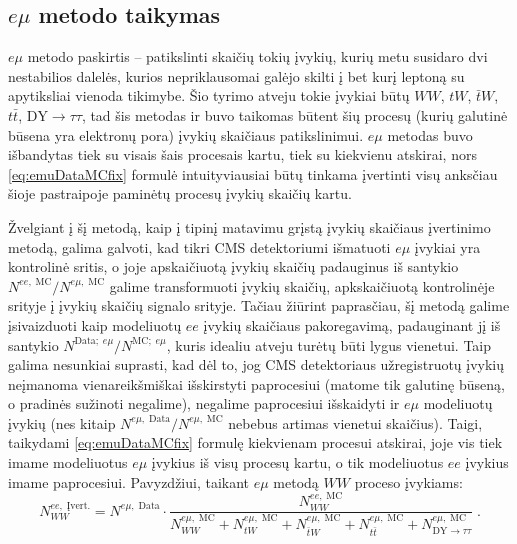 \documentclass[a4paper, 12pt]{article}
\newcommand{\WW}{W\! W}
\newcommand{\DYtau}{\mathrm{DY} \! \rightarrow \! \tau\tau}
\newlength\q
\begin{document}
\subsection{$e\mu$ metodo taikymas} \label{sec:emu}
$e\mu$ metodo paskirtis -- patikslinti skaičių tokių įvykių, kurių metu susidaro dvi nestabilios dalelės, kurios nepriklausomai galėjo skilti į bet kurį leptoną su apytiksliai vienoda tikimybe. Šio tyrimo atveju tokie įvykiai būtų $\WW$, $tW$, $\bar{t}W$, $t\bar{t}$, $\DYtau$, tad šis metodas ir buvo taikomas būtent šių procesų (kurių galutinė būsena yra elektronų pora) įvykių skaičiaus patikslinimui. $e\mu$ metodas buvo išbandytas tiek su visais šais procesais kartu, tiek su kiekvienu atskirai, nors \eqref{eq:emuDataMCfix} formulė intuityviausiai būtų tinkama įvertinti visų anksčiau šioje pastraipoje paminėtų procesų įvykių skaičių kartu.

Žvelgiant į šį metodą, kaip į tipinį matavimu grįstą įvykių skaičiaus įvertinimo metodą, galima galvoti, kad tikri CMS detektoriumi išmatuoti $e\mu$ įvykiai yra kontrolinė sritis, o joje apskaičiuotą įvykių skaičių padauginus iš santykio $N^{ee , \; \mathrm{MC}}/N^{e\mu , \; \mathrm{MC}}$ galime transformuoti įvykių skaičių, apkskaičiuotą kontrolinėje srityje į įvykių skaičių signalo srityje. Tačiau žiūrint paprasčiau, šį metodą galime įsivaizduoti kaip modeliuotų $ee$ įvykių skaičiaus pakoregavimą, padauginant jį iš santykio $N^{\mathrm{Data}; \; e\mu}/N^{\mathrm{MC}; \; e\mu}$, kuris idealiu atveju turėtų būti lygus vienetui. Taip galima nesunkiai suprasti, kad dėl to, jog CMS detektoriaus užregistruotų įvykių neįmanoma vienareikšmiškai išskirstyti paprocesiui (matome tik galutinę būseną, o pradinės sužinoti negalime), negalime paprocesiui išskaidyti ir $e\mu$ modeliuotų įvykių (nes kitaip $N^{e\mu, \; \mathrm{Data}}/N^{e\mu , \; \mathrm{MC}}$ nebebus artimas vienetui skaičius). Taigi, taikydami \eqref{eq:emuDataMCfix} formulę kiekvienam procesui atskirai, joje vis tiek imame modeliuotus $e\mu$ įvykius iš visų procesų kartu, o tik modeliuotus $ee$ įvykius imame paprocesiui. Pavyzdžiui, taikant $e\mu$ metodą $\WW$ proceso įvykiams:
\begin{equation}
\label{eq:emuSingleProc}
N_{\WW}^{ee , \; \mathrm{Įvert.}}=N^{e\mu, \; \mathrm{Data}}\cdot\frac{N_{\WW}^{ee , \; \mathrm{MC}}}{N_{\WW}^{e\mu , \; \mathrm{MC}}+N_{tW}^{e\mu , \; \mathrm{MC}}+N_{\bar{t}W}^{e\mu , \; \mathrm{MC}}+N_{t\bar{t}}^{e\mu , \; \mathrm{MC}}+N_{\DYtau}^{e\mu , \; \mathrm{MC}}} \; .
\end{equation}
\end{document}
